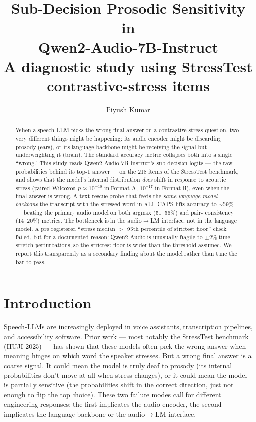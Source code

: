 \documentclass[11pt]{article}
\title{Sub-Decision Prosodic Sensitivity in\\Qwen2-Audio-7B-Instruct\\
\large A diagnostic study using StressTest contrastive-stress items}
\author{Piyush Kumar}
\date{}
\begin{document}
\maketitle

\begin{abstract}
When a speech-LLM picks the wrong final answer on a contrastive-stress
question, two very different things might be happening: its audio
encoder might be discarding prosody (ears), or its language backbone
might be receiving the signal but underweighting it (brain). The
standard accuracy metric collapses both into a single ``wrong.'' This
study reads Qwen2-Audio-7B-Instruct's sub-decision logits --- the raw
probabilities behind its top-1 answer --- on the 218 items of the
StressTest benchmark, and shows that the model's internal
distribution \emph{does} shift in response to acoustic stress (paired
Wilcoxon $p \approx 10^{-18}$ in Format A, $10^{-17}$ in Format B),
even when the final answer is wrong. A text-rescue probe that feeds
the \emph{same language-model backbone} the transcript with the
stressed word in ALL CAPS lifts accuracy to $\sim$59\% --- beating
the primary audio model on both argmax (51--56\%) and pair-
consistency (14--20\%) metrics. The bottleneck is in the
audio$\rightarrow$LM interface, not in the language model. A
pre-registered ``stress median $>$ 95th percentile of strictest
floor'' check failed, but for a documented reason: Qwen2-Audio is
unusually fragile to $\pm 2\%$ time-stretch perturbations, so the
strictest floor is wider than the threshold assumed. We report this
transparently as a secondary finding about the model rather than
tune the bar to pass.
\end{abstract}

\section{Introduction}

Speech-LLMs are increasingly deployed in voice assistants,
transcription pipelines, and accessibility software. Prior work ---
most notably the StressTest benchmark (HUJI 2025) --- has shown that
these models often pick the wrong answer when meaning hinges on
which word the speaker stresses. But a wrong final answer is a
coarse signal. It could mean the model is truly deaf to prosody
(its internal probabilities don't move at all when stress changes),
or it could mean the model is partially sensitive (the probabilities
shift in the correct direction, just not enough to flip the top
choice). These two failure modes call for different engineering
responses: the first implicates the audio encoder, the second
implicates the language backbone or the audio$\rightarrow$LM
interface.
\end{document}
